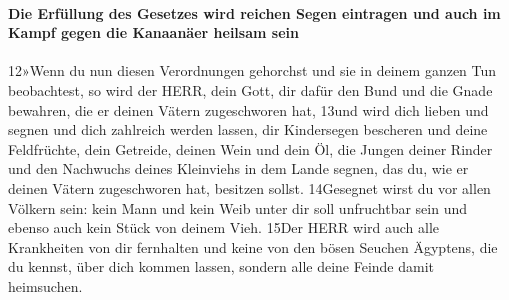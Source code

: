 \hypertarget{die-erfuxfcllung-des-gesetzes-wird-reichen-segen-eintragen-und-auch-im-kampf-gegen-die-kanaanuxe4er-heilsam-sein}{%
\paragraph{Die Erfüllung des Gesetzes wird reichen Segen eintragen und
auch im Kampf gegen die Kanaanäer heilsam
sein}\label{die-erfuxfcllung-des-gesetzes-wird-reichen-segen-eintragen-und-auch-im-kampf-gegen-die-kanaanuxe4er-heilsam-sein}}

12»Wenn du nun diesen Verordnungen gehorchst und sie in deinem ganzen
Tun beobachtest, so wird der HERR, dein Gott, dir dafür den Bund und die
Gnade bewahren, die er deinen Vätern zugeschworen hat, 13und wird dich
lieben und segnen und dich zahlreich werden lassen, dir Kindersegen
bescheren und deine Feldfrüchte, dein Getreide, deinen Wein und dein Öl,
die Jungen deiner Rinder und den Nachwuchs deines Kleinviehs in dem
Lande segnen, das du, wie er deinen Vätern zugeschworen hat, besitzen
sollst. 14Gesegnet wirst du vor allen Völkern sein: kein Mann und kein
Weib unter dir soll unfruchtbar sein und ebenso auch kein Stück von
deinem Vieh. 15Der HERR wird auch alle Krankheiten von dir fernhalten
und keine von den bösen Seuchen Ägyptens, die du kennst, über dich
kommen lassen, sondern alle deine Feinde damit heimsuchen.

